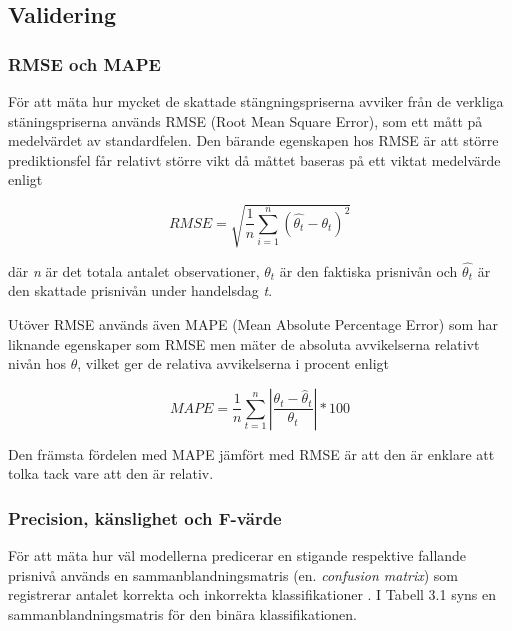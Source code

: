 \documentclass[11pt]{article}
\numberwithin{equation}{section}
\numberwithin{table}{section}
\numberwithin{figure}{section}
\begin{document}
\subsection{Validering}
\subsubsection{RMSE och MAPE}
För att mäta hur mycket de skattade stängningspriserna avviker från de verkliga stäningspriserna används RMSE (Root Mean Square Error), som ett mått på medelvärdet av standardfelen. Den bärande egenskapen hos RMSE är att större prediktionsfel får relativt större vikt då måttet baseras på ett viktat medelvärde enligt

\begin{equation}
RMSE = \sqrt{\frac{1}{n}\sum_{i=1}^{n}   (\hat{\theta_{t}} - \theta_{t})^2}
\end{equation}

där \emph{n} är det totala antalet observationer, $\theta_{t}$ är den faktiska prisnivån och $\hat{\theta_{t}}$ är den skattade prisnivån under handelsdag \emph{t}. 

Utöver RMSE används även MAPE (Mean Absolute Percentage Error) som har liknande egenskaper som RMSE men mäter de absoluta avvikelserna relativt nivån hos $\theta$, vilket ger de relativa avvikelserna i procent enligt

\begin{equation}
    \textit{MAPE}=\frac{1}{n} 
    \sum_{t=1}^{n} \left| \frac{\theta_{t}-\hat{\theta}_{t}}{\theta_{t}} \right| * 100
\end{equation}

Den främsta fördelen med MAPE jämfört med RMSE är att den är enklare att tolka tack vare att den är relativ. 




\subsubsection{Precision, känslighet och F-värde}
För att mäta hur väl modellerna predicerar en stigande respektive fallande prisnivå används en sammanblandningsmatris (en. \textit{confusion matrix}) som registrerar antalet korrekta och inkorrekta klassifikationer \parencite{ModelValidation}. I Tabell 3.1 syns en sammanblandningsmatris för den binära klassifikationen.
\end{document}
